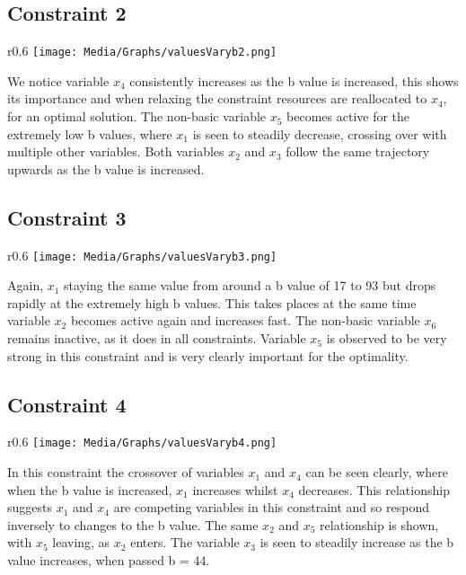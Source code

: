 \documentclass{article}
\numberwithin{equation}{section}
\begin{document}
\subsection{Constraint 2}
\begin{wrapfigure}{r}{0.6\textwidth}
    \centering
    \texttt{[image: Media/Graphs/valuesVaryb2.png]}
\end{wrapfigure}
We notice variable $x_4$ consistently increases as the b value is increased, this shows its importance and when relaxing the constraint resources are reallocated to $x_4$, for an optimal solution. The non-basic variable $x_5$ becomes active for the extremely low b values, where $x_1$ is seen to steadily decrease, crossing over with multiple other variables.  Both variables $x_2$ and $x_3$ follow the same trajectory upwards as the b value is increased. 
\subsection{Constraint 3}
\begin{wrapfigure}{r}{0.6\textwidth}
    \centering
    \texttt{[image: Media/Graphs/valuesVaryb3.png]}
\end{wrapfigure}
Again, $x_1$ staying the same value from around a b value of 17 to 93 but drops rapidly at the extremely high b values. This takes places at the same time variable $x_2$ becomes active again and increases fast. The non-basic variable $x_6$ remains inactive, as it does in all constraints. Variable $x_5$ is observed to be very strong in this constraint and is very clearly important for the optimality. 
\subsection{Constraint 4}
\begin{wrapfigure}{r}{0.6\textwidth}
    \centering
    \texttt{[image: Media/Graphs/valuesVaryb4.png]}
\end{wrapfigure}
In this constraint the crossover of variables $x_1$ and $x_4$ can be seen clearly, where when the b value is increased, $x_1$ increases whilst $x_4$ decreases. This relationship suggests $x_1$ and $x_4$ are competing variables in this constraint and so respond inversely to changes to the b value. The same $x_2$ and $x_5$ relationship is shown, with $x_5$ leaving, as $x_2$ enters. The variable $x_3$ is seen to steadily increase as the b value increases, when passed b = 44. 
\newpage
\end{document}
